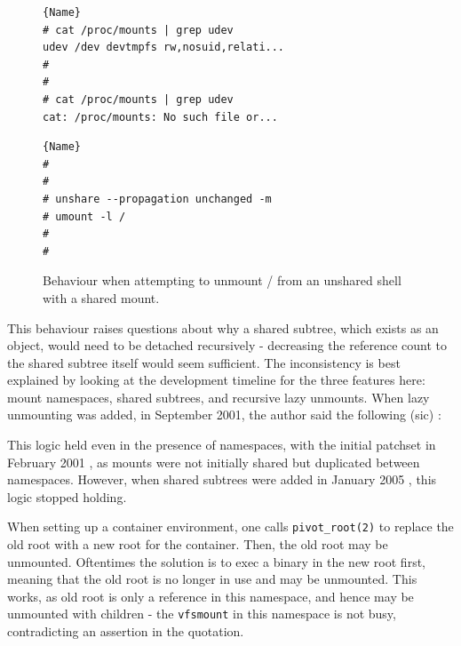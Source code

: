 \documentclass[a4paper,12pt,twoside,openright]{report}
\begin{document}
\begin{figure}
\begin{minipage}{.45\textwidth}

\begin{lstlisting}[frame=tlrb,showlines=true]{Name}
# cat /proc/mounts | grep udev
udev /dev devtmpfs rw,nosuid,relati...
#
#
# cat /proc/mounts | grep udev
cat: /proc/mounts: No such file or...
\end{lstlisting}
\end{minipage}\hfill
\begin{minipage}{.45\textwidth}

\begin{lstlisting}[frame=tlrb]{Name}
#
#
# unshare --propagation unchanged -m
# umount -l /
#
#
\end{lstlisting}

\end{minipage}

\caption{Behaviour when attempting to unmount / from an unshared shell with a shared mount.}
\label{fig:unshare-umount-lazy}
\end{figure}

This behaviour raises questions about why a shared subtree, which exists as an object, would need to be detached recursively - decreasing the reference count to the shared subtree itself would seem sufficient. The inconsistency is best explained by looking at the development timeline for the three features here: mount namespaces, shared subtrees, and recursive lazy unmounts. When lazy unmounting was added, in September 2001, the author said the following (sic) \citep{viro_patch_2001}:


This logic held even in the presence of namespaces, with the initial patchset in February 2001 \citep{viro_patch_2001}, as mounts were not initially shared but duplicated between namespaces. However, when shared subtrees were added in January 2005 \citep{viro_rfc_2005}, this logic stopped holding.

When setting up a container environment, one calls \texttt{pivot\_root(2)} to replace the old root with a new root for the container. Then, the old root may be unmounted. Oftentimes the solution is to exec a binary in the new root first, meaning that the old root is no longer in use and may be unmounted. This works, as old root is only a reference in this namespace, and hence may be unmounted with children - the \texttt{vfsmount} in this namespace is not busy, contradicting an assertion in the quotation.
\end{document}
